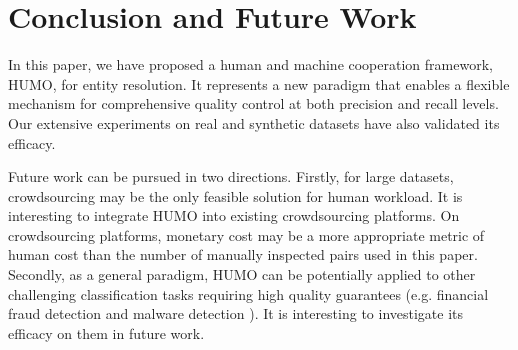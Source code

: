 \section{Conclusion and Future Work} \label{sec:conclusion}
   In this paper, we have proposed a human and machine cooperation framework, HUMO, for entity resolution. It represents a new paradigm that enables a flexible mechanism for comprehensive quality control at both precision and recall levels. Our extensive experiments on real and synthetic datasets have also validated its efficacy.

   Future work can be pursued in two directions. Firstly, for large datasets, crowdsourcing may be the only feasible solution for human workload. It is interesting to integrate HUMO into existing crowdsourcing platforms. On crowdsourcing platforms, monetary cost may be a more appropriate metric of human cost than the number of manually inspected pairs used in this paper. Secondly, as a general paradigm, HUMO can be potentially applied to other challenging classification tasks requiring high quality guarantees (e.g. financial fraud detection \cite{ngai2011application} and malware detection \cite{ye2017survey}). It is interesting to investigate its efficacy on them in future work.
